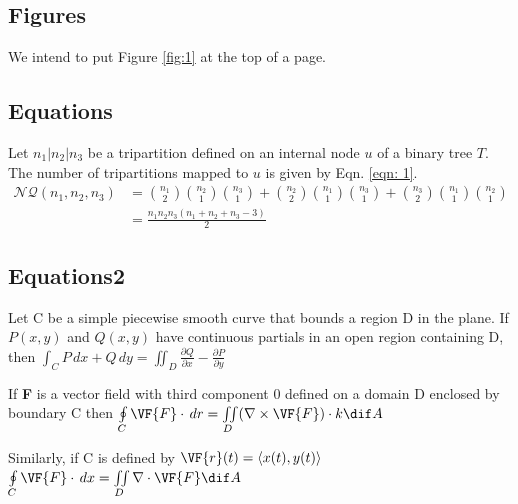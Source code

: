 \documentclass[12pt, a4paper]{article}
\begin{document}
	\subsection{Figures}
	We intend to put Figure \ref{fig:1} at the top of a page.
	\subsection{Equations}
	Let $n_1 |n_2 |n_3$ be a tripartition defined on an internal node $u$ of a binary tree $T$. The
	number of tripartitions mapped to $u$ is given by Eqn. \ref{eqn: 1}.
	\begin{equation}
		\label{eqn: 1}
		\begin{aligned}
			\mathcal{N} \mathcal{Q}(n_1, n_2, n_3) 
			& ={{n_1}\choose{2}} {{n_2}\choose{1}} {{n_3}\choose{1}} + {{n_2}\choose{2}} {{n_1}\choose{1}} {{n_3}\choose{1}} + {{n_3}\choose{2}} {{n_1}\choose{1}} {{n_2}\choose{1}} \\
			& = \frac{n_1n_2n_3(n_1+n_2+n_3-3)}{2}
		\end{aligned}	
	\end{equation}
	
	\subsection{Equations2}
    Let C be a simple piecewise smooth curve that bounds a region D in the plane. If $P(x, y)$ and $Q(x, y)$ have continuous partials in an open region containing D, then\linebreak
    $\int_C P \,dx + Q \,dy = \iint_D \frac{\partial Q}{\partial x} - \frac{\partial P}{\partial y}$
    \par
    If \textbf{F} is a vector field with third component 0 defined on a domain D enclosed by boundary C then\linebreak
    $ \oint\limits_C \VF{F}\cdot \,dr = \iint\limits_D (\nabla \times \VF{F})\cdot k \dif A $
    \par
    Similarly, if C is defined by $\VF{r}(t) = \langle x(t), y(t) \rangle$\linebreak
    $ \oint\limits_C \VF{F}\cdot \,dx  = \iint\limits_D \nabla \cdot \VF{F}\dif A $
    
\end{document}
